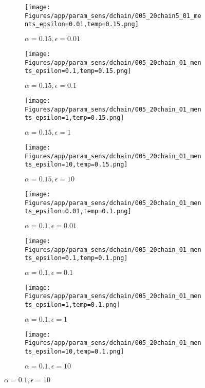 \documentclass{article}
\theoremstyle{plain}
\begin{document}
\begin{appendices}
\begin{figure}
                \begin{subfigure}[b]{0.24\textwidth}
                    \centering
                    \texttt{[image: Figures/app/param\_sens/dchain/005\_20chain5\_01\_ments\_epsilon=0.01,temp=0.15.png]}
                    \caption*{$\alpha=0.15,\epsilon=0.01$}
                \end{subfigure}
                \begin{subfigure}[b]{0.24\textwidth}
                    \centering
                    \texttt{[image: Figures/app/param\_sens/dchain/005\_20chain\_01\_ments\_epsilon=0.1,temp=0.15.png]}
                    \caption*{$\alpha=0.15,\epsilon=0.1$}
                \end{subfigure}
                \begin{subfigure}[b]{0.24\textwidth}
                    \centering
                    \texttt{[image: Figures/app/param\_sens/dchain/005\_20chain\_01\_ments\_epsilon=1,temp=0.15.png]}
                    \caption*{$\alpha=0.15,\epsilon=1$}
                \end{subfigure}
                \begin{subfigure}[b]{0.24\textwidth}
                    \centering
                    \texttt{[image: Figures/app/param\_sens/dchain/005\_20chain\_01\_ments\_epsilon=10,temp=0.15.png]}
                    \caption*{$\alpha=0.15,\epsilon=10$}
                \end{subfigure}
                
                \begin{subfigure}[b]{0.24\textwidth}
                    \centering
                    \texttt{[image: Figures/app/param\_sens/dchain/005\_20chain\_01\_ments\_epsilon=0.01,temp=0.1.png]}
                    \caption*{$\alpha=0.1,\epsilon=0.01$}
                \end{subfigure}
                \begin{subfigure}[b]{0.24\textwidth}
                    \centering
                    \texttt{[image: Figures/app/param\_sens/dchain/005\_20chain\_01\_ments\_epsilon=0.1,temp=0.1.png]}
                    \caption*{$\alpha=0.1,\epsilon=0.1$}
                \end{subfigure}
                \begin{subfigure}[b]{0.24\textwidth}
                    \centering
                    \texttt{[image: Figures/app/param\_sens/dchain/005\_20chain\_01\_ments\_epsilon=1,temp=0.1.png]}
                    \caption*{$\alpha=0.1,\epsilon=1$}
                \end{subfigure}
                \begin{subfigure}[b]{0.24\textwidth}
                    \centering
                    \texttt{[image: Figures/app/param\_sens/dchain/005\_20chain\_01\_ments\_epsilon=10,temp=0.1.png]}
                    \caption*{$\alpha=0.1,\epsilon=10$}
                \end{subfigure}
                

\end{figure}
\end{appendices}
\end{document}
